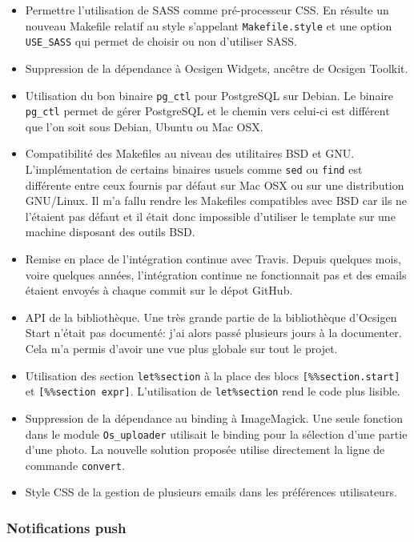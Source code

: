 \begin{itemize}
  \item Permettre l'utilisation de SASS comme pré-processeur CSS. En résulte un
    nouveau Makefile relatif au style s'appelant \verb|Makefile.style| et une
    option \verb|USE_SASS| qui permet de choisir ou non d'utiliser SASS.
  \item Suppression de la dépendance à Ocsigen Widgets, ancêtre de Ocsigen Toolkit.
  \item Utilisation du bon binaire \verb|pg_ctl| pour PostgreSQL sur Debian. Le
    binaire \verb|pg_ctl| permet de gérer PostgreSQL et le chemin vers celui-ci
    est différent que l'on soit sous Debian, Ubuntu ou Mac OSX.
  \item Compatibilité des Makefiles au niveau des utilitaires BSD et GNU.
    L'implémentation de certains binaires usuels comme \verb|sed| ou \verb|find|
    est différente entre ceux fournis par défaut sur Mac OSX ou sur une
    distribution GNU/Linux. Il m'a fallu rendre les Makefiles compatibles avec
    BSD car ils ne l'étaient pas défaut et il était donc impossible d'utiliser
    le template sur une machine disposant des outils BSD.
  \item Remise en place de l'intégration continue avec Travis. Depuis quelques
    mois, voire quelques années, l'intégration continue ne fonctionnait pas et
    des emails étaient envoyés à chaque commit sur le dépot GitHub.
  \item API de la bibliothèque. Une très grande partie de la bibliothèque
    d'Ocsigen Start n'était pas documenté: j'ai alors passé plusieurs jours à la
    documenter. Cela m'a permis d'avoir une vue plus globale sur tout le projet.
  \item Utilisation des section \verb|let%section| à la place des blocs
    \verb|[%%section.start]| et \verb|[%%section expr]|. L'utilisation de
    \verb|let%section| rend le code plus lisible.
  \item Suppression de la dépendance au binding à ImageMagick. Une seule
    fonction dans le module \verb|Os_uploader| utilisait le binding pour la
    sélection d'une partie d'une photo. La nouvelle solution proposée utilise
    directement la ligne de commande \verb|convert|.
  \item Style CSS de la gestion de plusieurs emails dans les préférences
    utilisateurs.
\end{itemize}

\subsubsection*{Notifications push}

